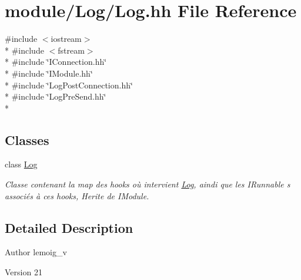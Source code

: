 \hypertarget{_log_8hh}{}\section{module/\+Log/\+Log.hh File Reference}
\label{_log_8hh}
{\ttfamily \#include $<$iostream$>$}\\*
{\ttfamily \#include $<$fstream$>$}\\*
{\ttfamily \#include \char`\"{}I\+Connection.\+hh\char`\"{}}\\*
{\ttfamily \#include \char`\"{}I\+Module.\+hh\char`\"{}}\\*
{\ttfamily \#include \char`\"{}Log\+Post\+Connection.\+hh\char`\"{}}\\*
{\ttfamily \#include \char`\"{}Log\+Pre\+Send.\+hh\char`\"{}}\\*
\subsection*{Classes}
\begin{DoxyCompactItemize}
\item 
class \hyperlink{class_log}{Log}
\begin{DoxyCompactList}\small\item\em Classe contenant la map des hooks où intervient \hyperlink{class_log}{Log}, aindi que les I\+Runnable s associés à ces hooks, Herite de I\+Module. \end{DoxyCompactList}\end{DoxyCompactItemize}


\subsection{Detailed Description}
\begin{DoxyAuthor}{Author}
lemoig\+\_\+v 
\end{DoxyAuthor}
\begin{DoxyVersion}{Version}
21 
\end{DoxyVersion}
